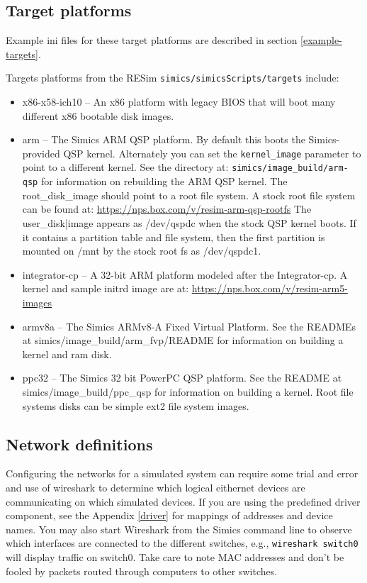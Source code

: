 \documentclass[titlepage]{article}
\begin{document}
\subsection{Target platforms}
\label{target-platforms}
Example ini files for these target platforms are described in section \ref{example-targets}.

Targets platforms from the RESim {\tt simics/simicsScripts/targets} include:
\begin{itemize}
\item x86-x58-ich10 -- An x86 platform with legacy BIOS that will boot many different x86 bootable disk images. 
\item arm -- The Simics ARM QSP platform.  By default this boots the Simics-provided QSP kernel.  Alternately you can set the {\tt kernel\_image} 
parameter to point to a different kernel.  See the directory at:
\newline
{\tt simics/image\_build/arm-qsp} for information on rebuilding the ARM QSP kernel.  The root\_disk\_image should point to a root file system.
A stock root file system can be found at: 
\newline
\url{https://nps.box.com/v/resim-arm-qsp-rootfs}
The user\_disk|image appears as /dev/qspdc when the stock QSP kernel boots.  If it contains a partition table and file system, then the first
partition is mounted on /mnt by the stock root fs as /dev/qspdc1.

\item integrator-cp -- A 32-bit ARM platform modeled after the Integrator-cp.  A kernel and sample initrd image are at:
\newline
\url{https://nps.box.com/v/resim-arm5-images}

\item armv8a -- The Simics ARMv8-A Fixed Virtual Platform.  See the READMEs at simics/image\_build/arm\_fvp/README for information on building a kernel
and ram disk.

\item ppc32 -- The Simics 32 bit PowerPC QSP platform.  See the README at simics/image\_build/ppc\_qsp for information on building a kernel. Root
file systems disks can be simple ext2 file system images.
\end{itemize}


\subsection{Network definitions}
\label{networks}
Configuring the networks for a simulated system can require some trial and error and use of wireshark to determine which
logical eithernet devices are communicating on which simulated devices.  If you are using the predefined driver component, see the 
Appendix \ref{driver} for mappings of addresses and device names.  You may also start Wireshark from the Simics command line to 
observe which interfaces are connected to the different switches, e.g., {\tt wireshark switch0} will display traffic on switch0.
Take care to note MAC addresses and don't be fooled by packets routed through computers to other switches.
\end{document}
